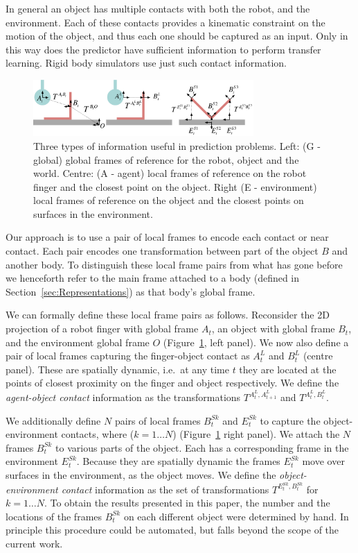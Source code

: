 In general an object has multiple contacts with both the robot, and the environment. Each of these contacts provides a kinematic constraint on the motion of the object, and thus each one should be captured as an input. Only in this way does the predictor have sufficient information to perform transfer learning. Rigid body simulators use just such contact information. 
\begin{figure}[t]
\centerline{\includegraphics[width=0.75\textwidth]{information}}
\caption{Three types of information useful in prediction problems. Left: (G - global) global frames of reference for the robot, object and the world. Centre: (A - agent) local frames of reference on the robot finger and the closest point on the object. Right (E - environment) local frames of reference on the object and the closest points on surfaces in the environment.}
\label{fig:Learning.setup2}
\end{figure}
Our approach is to use a pair of local frames to encode each contact or near contact. Each pair encodes one transformation between part of the object $B$ and another body.  To distinguish these local frame pairs from what has gone before we henceforth refer to the main frame attached to a body (defined in Section~\ref{sec:Representations}) as that body's global frame. 

We can formally define these local frame pairs as follows. Reconsider
the 2D projection of a robot finger with global frame $A_{t}$, an
object with global frame $B_{t}$, and the environment global frame $O$
(Figure~\ref{fig:Learning.setup2}, left panel). We now also define a pair of local frames
capturing the finger-object contact as $A^{L}_{t}$ and
$B^{L}_{t}$ (centre panel). These are spatially dynamic, i.e.\ at any time $t$ they
are located at the points of closest proximity on the finger and
object respectively.  We define the \textit{agent-object contact}
information as the transformations $T^{A^{L}_{t}, A^{L}_{t+1}}$ and
$T^{A^{L}_t, B^{L}_t}$.

We additionally define $N$ pairs of local frames $B^{Sk}_t$ and $E^{Sk}_t$ to
capture the object-environment contacts, where ($k=1 \ldots N$) (Figure~\ref{fig:Learning.setup2} right panel). We attach the $N$ frames $B^{Sk}_t$
to various parts of the object. Each has a corresponding frame in the
environment $E^{Sk}_t$.  Because they are spatially dynamic the
frames $E^{Sk}_t$ move over surfaces in the environment, as the
object moves. We define the \textit{object-environment contact}
information as the set of transformations $T^{E^{Sk}_t,B^{Sk}_t}$ for $k=1
\ldots N$. To obtain the results presented in this paper, the number and the
locations of the frames $B^{Sk}_t$ on each different object were
determined by hand. In principle this procedure could be automated,
but falls beyond the scope of the current work.

